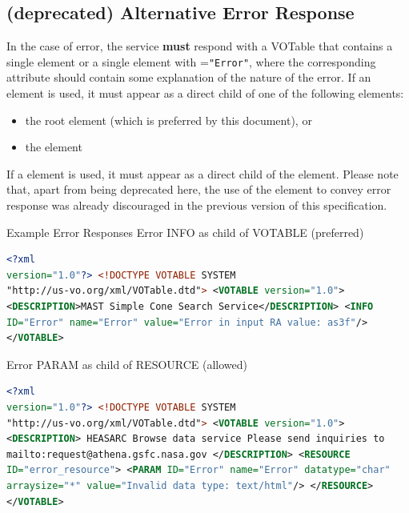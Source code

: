 \documentclass[11pt,a4paper]{ivoa} 
\begin{document}
\subsection{(\textbf{deprecated}) Alternative Error Response}
\label{subsec:err103} In the case of error, the service \textbf{must}
respond with a VOTable that contains a single  element or a
single  element with =\texttt{"Error"}, where
the corresponding  attribute should contain some
explanation of the nature of the error. If an  element is
used, it must appear as a direct child of one of the following elements:
\begin{itemize} \item the root  element (which is
preferred by this document), or \item the  element
\end{itemize}

If a  element is used, it must appear as a direct child of
the  element. Please note
that, apart from being deprecated here, the use of the 
element to convey error response was already discouraged in the previous
version of this specification.

\begin{bigdescription} \item[Example Error Responses] Error INFO as
child of VOTABLE (preferred)\\
\begin{lstlisting}[language=XML,basicstyle=\footnotesize] <?xml
version="1.0"?> <!DOCTYPE VOTABLE SYSTEM
"http://us-vo.org/xml/VOTable.dtd"> <VOTABLE version="1.0">
<DESCRIPTION>MAST Simple Cone Search Service</DESCRIPTION> <INFO
ID="Error" name="Error" value="Error in input RA value: as3f"/>
</VOTABLE> \end{lstlisting} Error PARAM as child of RESOURCE (allowed)
\begin{lstlisting}[language=XML,basicstyle=\footnotesize] <?xml
version="1.0"?> <!DOCTYPE VOTABLE SYSTEM
"http://us-vo.org/xml/VOTable.dtd"> <VOTABLE version="1.0">
<DESCRIPTION> HEASARC Browse data service Please send inquiries to
mailto:request@athena.gsfc.nasa.gov </DESCRIPTION> <RESOURCE
ID="error_resource"> <PARAM ID="Error" name="Error" datatype="char"
arraysize="*" value="Invalid data type: text/html"/> </RESOURCE>
</VOTABLE> \end{lstlisting} \end{bigdescription}
\end{document}
